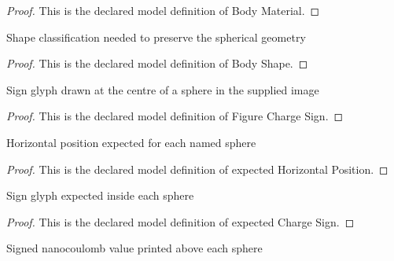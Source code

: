 \begin{proof}
  This is the declared model definition of Body Material.
\end{proof}
\begin{definition}
  \label{def:physics:phyx-mini-0873:phyxminiproblems-problemphyxmini0873-bodyshape}
  Shape classification needed to preserve the spherical geometry
\end{definition}
\begin{proof}
  This is the declared model definition of Body Shape.
\end{proof}
\begin{definition}
  \label{def:physics:phyx-mini-0873:phyxminiproblems-problemphyxmini0873-figurechargesign}
  Sign glyph drawn at the centre of a sphere in the supplied image
\end{definition}
\begin{proof}
  This is the declared model definition of Figure Charge Sign.
\end{proof}
\begin{definition}
  \label{def:physics:phyx-mini-0873:phyxminiproblems-problemphyxmini0873-expectedhorizontalposition}
  Horizontal position expected for each named sphere
\end{definition}
\begin{proof}
  This is the declared model definition of expected Horizontal Position.
\end{proof}
\begin{definition}
  \label{def:physics:phyx-mini-0873:phyxminiproblems-problemphyxmini0873-expectedchargesign}
  Sign glyph expected inside each sphere
\end{definition}
\begin{proof}
  This is the declared model definition of expected Charge Sign.
\end{proof}
\begin{definition}
  \label{def:physics:phyx-mini-0873:phyxminiproblems-problemphyxmini0873-expectedprintedchargeinnanocoulombs}
  Signed nanocoulomb value printed above each sphere
\end{definition}
